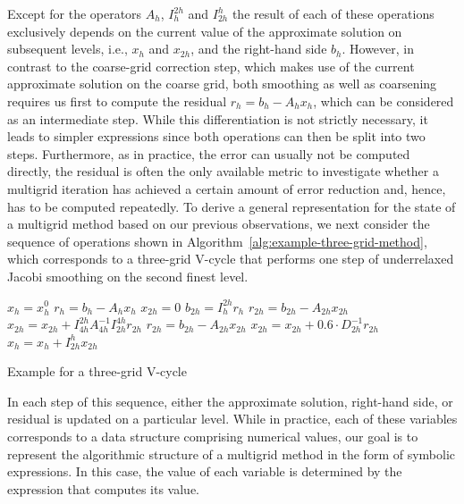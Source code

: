Except for the operators $A_h$, $I_h^{2h}$ and $I_{2h}^h$ the result of each of these operations exclusively depends on the current value of the approximate solution on subsequent levels, i.e., $x_{h}$ and $x_{2h}$, and the right-hand side $b_h$.
However, in contrast to the coarse-grid correction step, which makes use of the current approximate solution on the coarse grid, both smoothing as well as coarsening requires us first to compute the residual $r_h = b_h - A_h x_h$, which can be considered as an intermediate step.
While this differentiation is not strictly necessary, it leads to simpler expressions since both operations can then be split into two steps.
Furthermore, as in practice, the error can usually not be computed directly, the residual is often the only available metric to investigate whether a multigrid iteration has achieved a certain amount of error reduction and, hence, has to be computed repeatedly.
To derive a general representation for the state of a multigrid method based on our previous observations, we next consider the sequence of operations shown in Algorithm~\ref{alg:example-three-grid-method}, which corresponds to a three-grid V-cycle that performs one step of underrelaxed Jacobi smoothing on the second finest level.
\begin{algorithm}
	\begin{algorithmic}[1]
		\State $x_{h} = x_{h}^{0}$
		\State $r_{h} = b_{h} - A_h x_{h} $
		\State $ x_{2h} = 0$
		\State $ b_{2h} = I_{h}^{2h} r_{h}$
		\State $ r_{2h} = b_{2h} - A_{2h} x_{2h}$
		\State $ x_{2h} = x_{2h} + I_{4h}^{2h} A_{4h}^{-1} I_{2h}^{4h} r_{2h}$
		\State $ r_{2h} = b_{2h} - A_{2h} x_{2h}$
		\State $ x_{2h} = x_{2h} + 0.6 \cdot D_{2h}^{-1} r_{2h}$
		\State $x_{h} = x_{h}  + I_{2h}^h x_{2h}$
	\end{algorithmic}
\caption{Example for a three-grid V-cycle}
\label{alg:example-three-grid-method}
\end{algorithm}
In each step of this sequence, either the approximate solution, right-hand side, or residual is updated on a particular level.
While in practice, each of these variables corresponds to a data structure comprising numerical values, our goal is to represent the algorithmic structure of a multigrid method in the form of symbolic expressions.
In this case, the value of each variable is determined by the expression that computes its value.

